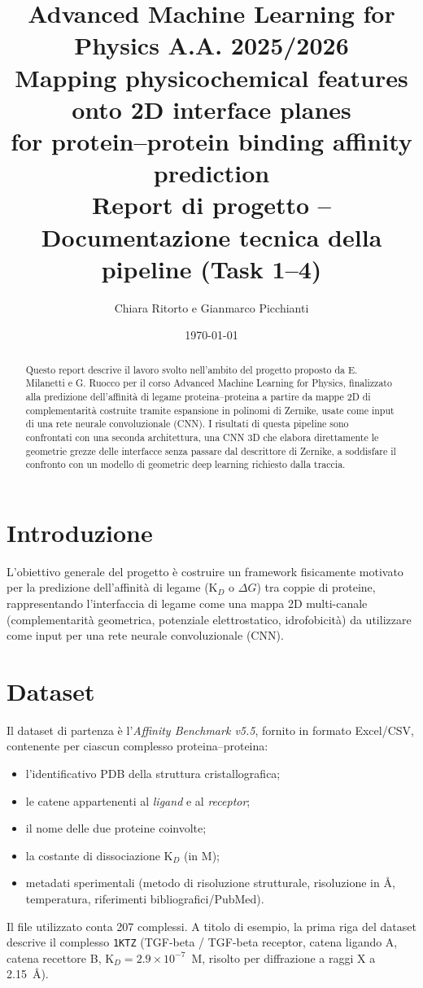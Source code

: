 \documentclass[11pt,a4paper]{article}
\title{\Large Advanced Machine Learning for Physics A.A. 2025/2026\\[4pt]
\LARGE Mapping physicochemical features onto 2D interface planes\\
for protein--protein binding affinity prediction\\[4pt]
\large Report di progetto -- Documentazione tecnica della pipeline (Task 1--4)}
\author{Chiara Ritorto e Gianmarco Picchianti}
\date{\today}
\begin{document}
\maketitle

\begin{abstract}
Questo report descrive il lavoro svolto nell'ambito del progetto proposto da E. Milanetti e G. Ruocco per il corso Advanced Machine Learning for Physics, finalizzato alla predizione dell'affinità di legame proteina--proteina a partire da mappe 2D di complementarità costruite tramite espansione in polinomi di Zernike, usate come input di una rete neurale convoluzionale (CNN). I risultati di questa pipeline sono confrontati con una seconda architettura, una CNN 3D che elabora direttamente le geometrie grezze delle interfacce senza passare dal descrittore di Zernike, a soddisfare il confronto con un modello di geometric deep learning richiesto dalla traccia.
\end{abstract}

\tableofcontents

\section{Introduzione}
L'obiettivo generale del progetto è costruire un framework fisicamente motivato per la predizione dell'affinità di legame (K$_D$ o $\Delta G$) tra coppie di proteine, rappresentando l'interfaccia di legame come una mappa 2D multi-canale (complementarità geometrica, potenziale elettrostatico, idrofobicità) da utilizzare come input per una rete neurale convoluzionale (CNN).

\section{Dataset}
Il dataset di partenza è l'\emph{Affinity Benchmark v5.5}, fornito in formato Excel/CSV, contenente per ciascun complesso proteina--proteina:
\begin{itemize}
    \item l'identificativo PDB della struttura cristallografica;
    \item le catene appartenenti al \emph{ligand} e al \emph{receptor};
    \item il nome delle due proteine coinvolte;
    \item la costante di dissociazione K$_D$ (in M);
    \item metadati sperimentali (metodo di risoluzione strutturale, risoluzione in \r{A}, temperatura, riferimenti bibliografici/PubMed).
\end{itemize}
Il file utilizzato conta 207 complessi. A titolo di esempio, la prima riga del dataset descrive il complesso \texttt{1KTZ} (TGF-beta / TGF-beta receptor, catena ligando A, catena recettore B, K$_D = 2.9\times10^{-7}$~M, risolto per diffrazione a raggi X a 2.15~\r{A}).
\end{document}
